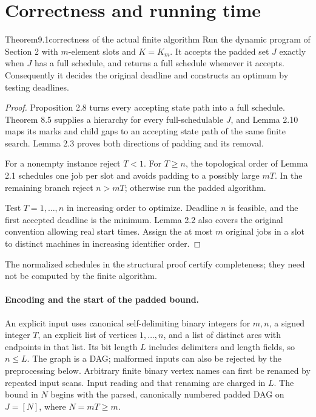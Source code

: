 \section{Correctness and running time}

\begin{numbered}{Theorem}{9.1}{correctness of the actual finite algorithm}
Run the dynamic program of Section 2 with $m$-element slots and $K=K_m$.
It accepts the padded set $J$ exactly when $J$ has a full schedule, and
returns a full schedule whenever it accepts. Consequently it decides the
original deadline and constructs an optimum by testing deadlines.
\end{numbered}
\begin{proof}
Proposition 2.8 turns every accepting state path into a full schedule.
Theorem 8.5 supplies a hierarchy for every full-schedulable $J$, and
Lemma 2.10 maps its marks and child gaps to an accepting state path of the
same finite search. Lemma 2.3 proves both directions of padding and its
removal.

For a nonempty instance reject $T<1$. For $T\geq n$, the topological
order of Lemma 2.1 schedules one job per slot and avoids padding to a
possibly large $mT$. In the remaining branch reject $n>mT$; otherwise
run the padded algorithm.

Test $T=1,\ldots,n$ in increasing order to optimize. Deadline $n$ is feasible, and the first accepted deadline is the
minimum. Lemma 2.2 also covers the original convention allowing real
start times. Assign the at most $m$ original jobs in a slot to distinct
machines in increasing identifier order.
\end{proof}

The normalized schedules in the structural proof certify completeness;
they need not be computed by the finite algorithm.

\paragraph{Encoding and the start of the padded bound.}
An explicit input uses canonical self-delimiting binary integers for
$m,n$, a signed integer $T$, an explicit list of vertices $1,\ldots,n$,
and a list of distinct arcs with endpoints in that list. Its bit length
$L$ includes delimiters and length fields, so $n\leq L$.
The graph is a DAG; malformed inputs can also be rejected by the
preprocessing below. Arbitrary finite binary vertex names can first be
renamed by repeated input scans. Input reading and that renaming are
charged in $L$. The bound in $N$ begins with the parsed, canonically
numbered padded DAG on $J=[N]$, where $N=mT\geq m$.

